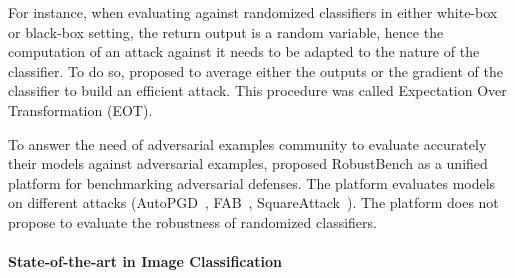 For instance, when evaluating against randomized classifiers in either white-box or black-box setting, the return output is a random variable, hence the computation of an attack against it needs to be adapted to the nature of the classifier. To do so, \cite{athalye2018obfuscated} proposed to average either the outputs or the gradient of the classifier to build an efficient attack. This procedure was called Expectation Over Transformation (EOT). 

To answer the need of adversarial examples community to evaluate accurately their models against adversarial examples, \cite{croce2020robustbench} proposed RobustBench as a unified platform for benchmarking adversarial defenses. The platform evaluates models on different attacks (AutoPGD~\citep{Croce2020ReliableEO}, FAB~\citep{Croce2020MinimallyDA}, SquareAttack~\citep{andriushchenko2019square}). The platform  does not propose to evaluate the robustness of randomized classifiers. 

\paragraph{State-of-the-art in Image Classification}

